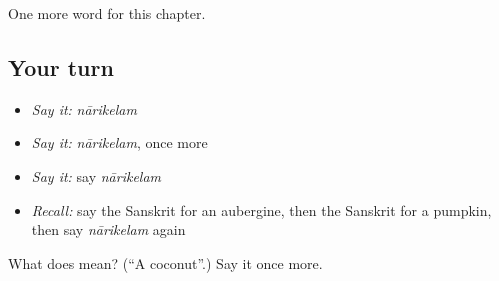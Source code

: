 \begin{grammarlens}[title={What you've built}]
One more word for this chapter.
\end{grammarlens}

\subsection*{Your turn}
\begin{itemize}
\raggedright
  \item \emph{Say it:} \emph{nārikelam}
  \item \emph{Say it:} \emph{nārikelam}, once more
  \item \emph{Say it:} say \emph{nārikelam}
  \item \emph{Recall:} say the Sanskrit for an aubergine, then the Sanskrit for a pumpkin, then say \emph{nārikelam} again
\end{itemize}

\begin{tcolorbox}[breakable,colback=teal!4,colframe=teal!35!black,title={Before you move on}]
What does  mean? (\textquotedblleft{}A coconut\textquotedblright{}.) Say it once more.
\end{tcolorbox}
